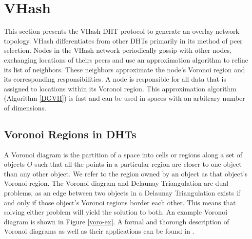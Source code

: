 \documentclass[10pt, conference, letterpaper]{IEEEtran}
\begin{document}



\section{VHash}
\label{vhash}
This section presents the VHash DHT protocol to generate an overlay network topology.
VHash differentiates from other DHTs primarily in its method of peer selection.
Nodes in the VHash network periodically gossip with other nodes, exchanging locations of theirs peers and use an approximation algorithm to refine its list of neighbors.
These neighbors approximate the node's Voronoi region and its corresponding responsibilities.
A node is responsible for all data that is assigned to locations within its Voronoi region.
This approximation algorithm (Algorithm \ref{DGVH}) is fast and can be used in spaces with an arbitrary number of dimensions.

\subsection{Voronoi Regions in DHTs}
A Voronoi diagram is the partition of a space into cells or regions along a set of objects $O$ such that all the points in a particular region are closer to one object than any other object.  
We refer to the region owned by an object as that object's Voronoi region.
The Voronoi diagram and Delaunay Triangulation are dual problems, as an edge between two objects in a Delaunay Triangulation exists if and only if those object's Voronoi regions border each other.  
This means that solving either problem will yield the solution to both.   An example Voronoi diagram is shown in Figure \ref{voro-ex}.
A formal and thorough description of Voronoi diagrams as well as their applications can be found in \cite{aurenhammer1991voronoi}.
\end{document}
